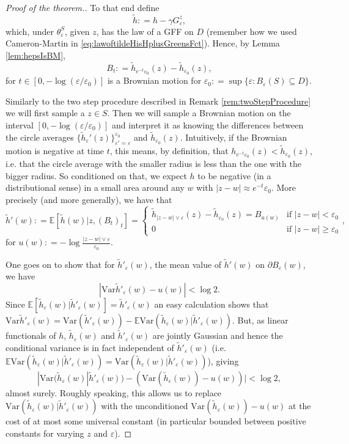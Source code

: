 \documentclass[11pt,reqno]{amsart}
\numberwithin{equation}{section}
\newcommand{\deq}{\mathrel{\mathop:}=}
\newcommand{\eps}{\varepsilon}
\begin{document}
\begin{proof}[Proof of the theorem.]
	To that end define $$\tilde h\deq h-\gamma G_\eps^z,$$ which, under $\theta_\eps^S$, given $z$, has the law of a GFF on $D$ (remember how we used Cameron-Martin in \eqref{eq:lawoftildeHisHplusGreensFct}).
	Hence, by Lemma \ref{lem:hepsIsBM}, $$B_t\deq\tilde h_{e^{-t}\eps_0}(z)-\tilde h_{\eps_0}(z),$$ for $t\in[0,-\log(\eps/\eps_0)]$ is a Brownian motion for $\eps_0\deq \sup\{\eps:B_\eps(S)\subseteq D\}$.
	
	Similarly to the two step procedure described in Remark \ref{rem:twoStepProcedure} we will first sample a $z\in S$. Then we will sample a Brownian motion on the interval $[0,-\log(\eps/\eps_0)]$ and interpret it as knowing the differences between the circle averages $\{\tilde h_\eps'(z)\}_{\eps'=\eps}^{\eps_0}$ and $\tilde h_{\eps_0}(z)$. Intuitively, if the Brownian motion is negative at time $t$, this means, by definition, that $h_{e^{-t}\eps_0}(z)<\tilde h_{\eps_0}(z)$, i.e. that the circle average with the smaller radius is less than the one with the bigger radius. So conditioned on that, we expect $h$ to be negative (in a distributional sense) in a small area around any $w$ with $|z-w|\approx e^{-t}\eps_0$.
	More precisely (and more generally), we have that $$\tilde h'(w)\deq\mathbb E[\tilde h(w)|z,(B_t)_t]=\begin{cases}
			\tilde h_{|z-w|\vee\eps}(z)-\tilde h_{\eps_0}(z)=B_{u(w)} &\text{if } |z-w|<\eps_0\\
			0 &\text{if } |z-w|\geq\eps_0
		\end{cases},$$
		for $u(w)\deq -\log\frac{|z-w|\vee\eps}{\eps_0}$.
	
	One goes on to show that for $\tilde h'_\eps(w)$, the mean value of $\tilde h'(w)$ on $\partial B_\eps(w)$, we have $$|\text{Var} \tilde h'_\eps(w)-u(w)|<\log 2.$$ Since $\mathbb E[\tilde h_\eps(w)|\tilde h'_\eps(w)]=\tilde h'_\eps(w)$ an easy calculation shows that $\text{Var}\tilde h'_\eps(w) = \text{Var}(\tilde h'_\eps(w))-\mathbb E\text{Var}(\tilde h_\eps(w)|\tilde h'_\eps(w))$. But, as linear functionals of $h$, $\tilde h_\eps(w)$ and $\tilde h'_\eps(w)$ are jointly Gaussian and hence the conditional variance is in fact independent of $\tilde h'_\eps(w)$ (i.e. $\mathbb E\text{Var}(\tilde h_\eps(w)|\tilde h'_\eps(w)) = \text{Var}(\tilde h_\eps(w)|\tilde h'_\eps(w))$), giving
	$$|\text{Var}(\tilde h_\eps(w)|\tilde h'_\eps(w))-(\text{Var}(\tilde h_\eps(w))-u(w))|<\log 2,$$ almost surely. Roughly speaking, this allows us to replace $\text{Var}(\tilde h_\eps(w)|\tilde h'_\eps(w))$ with the unconditioned $\text{Var}(\tilde h_\eps(w))-u(w)$ at the cost of at most some universal constant (in particular bounded between positive constants for varying $z$ and $\eps$).
	

\end{proof}
\end{document}
